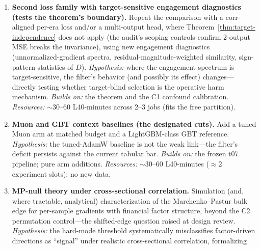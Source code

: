 \begin{enumerate}
    Build the pre-specified OHLCV protocol (public daily equities/crypto,
    purged temporal split, $\geq$90\% coverage after cleaning) and run
    MLP and GRU arms with the identical verdict machinery.
    \emph{Hypothesis:} the class-level harm of agreement-style filtering
    generalizes beyond Numerai's obfuscated within-era construct to a
    natural sequential financial task. \emph{Builds on:} exp-002's
    validated vmap-GRU stack and exp-005's within-era machinery.
    \emph{Resources:} $\sim$1--2 L40-hours total across 2--4 jobs (fits
    the free partition); data is free to download; $\sim$2--4 hours of
    engineering for the split/cleaning protocol.
  \item \textbf{Second loss family with target-sensitive engagement
    diagnostics (tests the theorem's boundary).} Repeat the comparison
    with a corr-aligned per-era loss and/or a multi-output head, where
    Theorem~\ref{thm:target-independence} does not apply (the audit's
    scoping controls confirm 2-output MSE breaks the invariance), using
    new engagement diagnostics (unnormalized-gradient spectra,
    residual-magnitude-weighted similarity, sign-pattern statistics of
    $D$). \emph{Hypothesis:} where the engagement spectrum is
    target-sensitive, the filter's behavior (and possibly its effect)
    changes---directly testing whether target-blind selection is the
    operative harm mechanism. \emph{Builds on:} the theorem and the C1
    confound calibration. \emph{Resources:} $\sim$30--60 L40-minutes
    across 2--3 jobs (fits the free partition).
  \item \textbf{Muon and GBT context baselines (the designated cuts).}
    Add a tuned Muon arm at matched budget
    \citep{gorishniy2026benchmarkingoptimizers} and a LightGBM-class GBT
    reference. \emph{Hypothesis:} the tuned-AdamW baseline is not the
    weak link---the filter's deficit persists against the current tabular
    bar. \emph{Builds on:} the frozen t07 pipeline; pure arm additions.
    \emph{Resources:} $\sim$30--60 L40-minutes ($\approx$2 experiment
    slots); no new data.
  \item \textbf{MP-null theory under cross-sectional correlation.}
    Simulation (and, where tractable, analytical) characterization of the
    Marchenko--Pastur bulk edge for per-sample gradients with financial
    factor structure, beyond the C2 permutation control---the shifted-edge
    question raised at design review. \emph{Hypothesis:} the hard-mode
    threshold systematically misclassifies factor-driven directions as
    ``signal'' under realistic cross-sectional correlation, formalizing

\end{enumerate}
